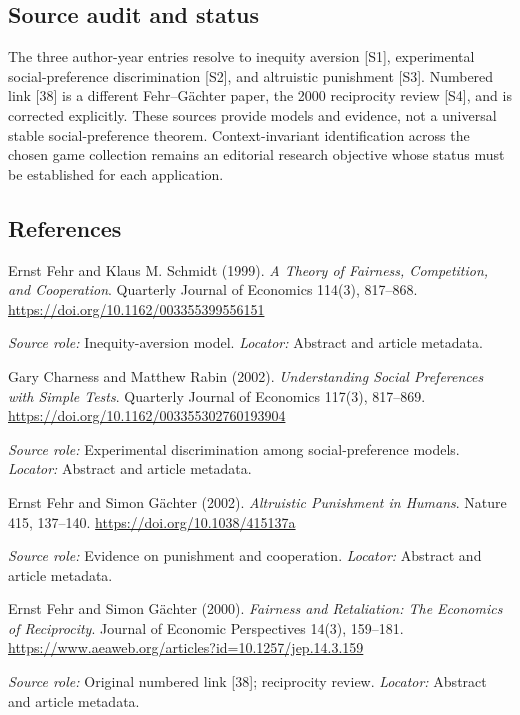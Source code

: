 \documentclass[11pt,a4paper]{article}
\begin{document}
\subsection*{Source audit and status}

The three author-year entries resolve to inequity aversion [S1], experimental social-preference discrimination [S2], and altruistic punishment [S3]. Numbered link [38] is a different Fehr--Gächter paper, the 2000 reciprocity review [S4], and is corrected explicitly. These sources provide models and evidence, not a universal stable social-preference theorem. Context-invariant identification across the chosen game collection remains an editorial research objective whose status must be established for each application.

\subsection*{References}

\begin{enumerate}[label={[S\arabic*]},leftmargin=*]

\item Ernst Fehr and Klaus M. Schmidt (1999). \emph{A Theory of Fairness, Competition, and Cooperation}. Quarterly Journal of Economics 114(3), 817--868. \url{https://doi.org/10.1162/003355399556151}\par \textit{Source role:} Inequity-aversion model. \textit{Locator:} Abstract and article metadata.

\item Gary Charness and Matthew Rabin (2002). \emph{Understanding Social Preferences with Simple Tests}. Quarterly Journal of Economics 117(3), 817--869. \url{https://doi.org/10.1162/003355302760193904}\par \textit{Source role:} Experimental discrimination among social-preference models. \textit{Locator:} Abstract and article metadata.

\item Ernst Fehr and Simon Gächter (2002). \emph{Altruistic Punishment in Humans}. Nature 415, 137--140. \url{https://doi.org/10.1038/415137a}\par \textit{Source role:} Evidence on punishment and cooperation. \textit{Locator:} Abstract and article metadata.

\item Ernst Fehr and Simon Gächter (2000). \emph{Fairness and Retaliation: The Economics of Reciprocity}. Journal of Economic Perspectives 14(3), 159--181. \url{https://www.aeaweb.org/articles?id=10.1257/jep.14.3.159}\par \textit{Source role:} Original numbered link [38]; reciprocity review. \textit{Locator:} Abstract and article metadata.

\end{enumerate}
\end{document}
